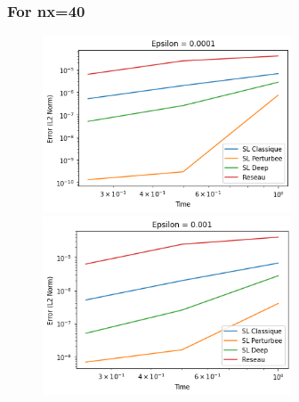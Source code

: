 \documentclass{article}
\begin{document}
\subsubsection*{For nx=40}
\begin{figure}[!h]
    \centering
    \includegraphics[width=0.66\textwidth]{images/ep21.png}
    \includegraphics[width=0.66\textwidth]{images/ep22.png}
\end{figure}
\end{document}
